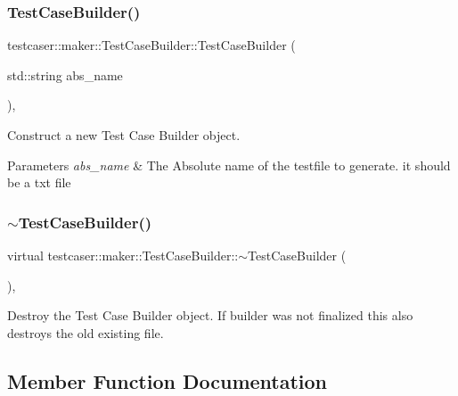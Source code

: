 \subsubsection{\texorpdfstring{TestCaseBuilder()}{TestCaseBuilder()}}
{\footnotesize\ttfamily testcaser\+::maker\+::\+Test\+Case\+Builder\+::\+Test\+Case\+Builder (\begin{DoxyParamCaption}\item[{std\+::string}]{abs\+\_\+name }\end{DoxyParamCaption})\hspace{0.3cm}{\ttfamily [inline]}, {\ttfamily [explicit]}}



Construct a new Test Case Builder object. 


\begin{DoxyParams}{Parameters}
{\em abs\+\_\+name} & The Absolute name of the testfile to generate. it should be a txt file \\
\hline
\end{DoxyParams}
\mbox{\label{classtestcaser_1_1maker_1_1TestCaseBuilder_ad463fd2e4c6175c15c310c4af66ec344}} 
\subsubsection{\texorpdfstring{$\sim$TestCaseBuilder()}{~TestCaseBuilder()}}
{\footnotesize\ttfamily virtual testcaser\+::maker\+::\+Test\+Case\+Builder\+::$\sim$\+Test\+Case\+Builder (\begin{DoxyParamCaption}{ }\end{DoxyParamCaption})\hspace{0.3cm}{\ttfamily [inline]}, {\ttfamily [virtual]}}



Destroy the Test Case Builder object. If builder was not finalized this also destroys the old existing file. 



\subsection{Member Function Documentation}
\mbox{\label{classtestcaser_1_1maker_1_1TestCaseBuilder_a5e148b382134f054b008cc22b063eae0}} 
